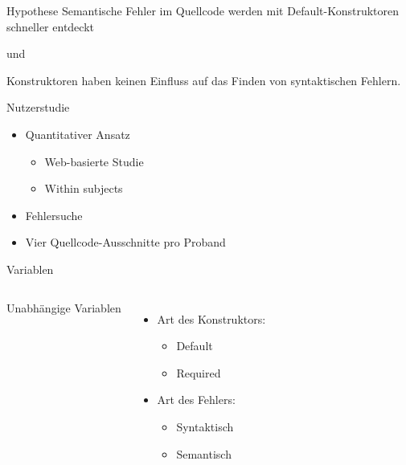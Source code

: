 \documentclass[10pt]{beamer}
\begin{document}
	\begin{frame}[standout]{Hypothese}
		Semantische Fehler im Quellcode werden mit Default-Konstruktoren schneller entdeckt
		\begin{center}\small{und}\end{center}
		Konstruktoren haben keinen Einfluss auf das Finden von syntaktischen Fehlern.
	\end{frame}

	\begin{frame}{Nutzerstudie}
		\begin{itemize}
			\item Quantitativer Ansatz
			\begin{itemize}
				\item Web-basierte Studie\\
				\item Within subjects\\
			\end{itemize}
			\vspace{\baselineskip}
			\item Fehlersuche\\
			\vspace{\baselineskip}
			\item Vier Quellcode-Ausschnitte pro Proband\\
		\end{itemize}
	\end{frame}
	
	\begin{frame}{Variablen}
		\begin{columns}[T,onlytextwidth]
	
			Unabhängige Variablen
			\begin{itemize}
				\item Art des Konstruktors:
				\begin{itemize}
					\item Default
					\item Required
				\end{itemize}
				\item Art des Fehlers:
				\begin{itemize}
					\item Syntaktisch
					\item Semantisch
				\end{itemize}
			\end{itemize}
			\vspace{13pt}			
		
			
		\end{columns}	
	\end{frame}
\end{document}
